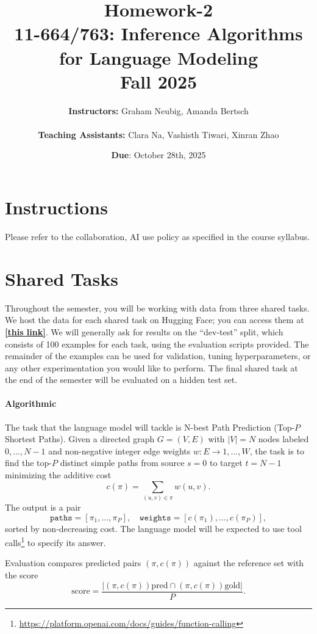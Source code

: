 \documentclass{article}
\title{Homework-2\\
11-664/763: Inference Algorithms for Language Modeling\\
Fall 2025}
\author{
    \textbf{Instructors:} Graham Neubig, Amanda Bertsch \\
    \\
    \textbf{Teaching Assistants:} Clara Na, Vashisth Tiwari, Xinran Zhao
}
\date{\textbf{Due}: October 28th, 2025}
\begin{document}
\maketitle

\section*{Instructions}

Please refer to the collaboration, AI use policy as specified in the course syllabus.

\section{Shared Tasks}
Throughout the semester, you will be working with data from three shared tasks. We host the data for each shared task on Hugging Face; you can access them at \textbf{\href{https://huggingface.co/datasets/vashistht/11763_datasets}{[this link]}}. We will generally ask for results on the ``dev-test'' split, which consists of 100 examples for each task, using the evaluation scripts provided. The remainder of the examples can be used for validation, tuning hyperparameters, or any other experimentation you would like to perform. The final shared task at the end of the semester will be evaluated on a hidden test set.

\paragraph{Algorithmic}

The task that the language model will tackle is N-best Path Prediction (Top-$P$ Shortest Paths).
Given a directed graph $G=(V,E)$ with $|V|=N$ nodes labeled $0,\dots,N-1$ and non-negative integer edge weights $w:E\to{1,\dots,W}$, the task is to find the top-$P$ distinct simple paths from source $s=0$ to target $t=N-1$ minimizing the additive cost
\begin{equation}
c(\pi)=\sum_{(u,v)\in \pi} w(u,v).
\end{equation}
The output is a pair
\begin{equation}
\texttt{paths}=[\pi_1,\dots,\pi_P],\quad \texttt{weights}=[c(\pi_1),\dots,c(\pi_P)],
\end{equation}
sorted by non-decreasing cost.
The language model will be expected to use tool calls\footnote{\url{https://platform.openai.com/docs/guides/function-calling}} to specify its answer.

Evaluation compares predicted pairs $(\pi,c(\pi))$ against the reference set with the score
\begin{equation}
\mathrm{score}=\frac{\left| {(\pi,c(\pi))}{\text{pred}} \cap {(\pi,c(\pi))}{\text{gold}} \right|}{P}.
\end{equation}
\end{document}
